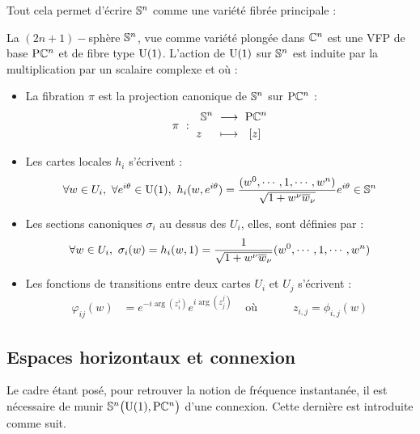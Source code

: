 Tout cela permet d'écrire $\S{n}$ comme une variété fibrée principale :
\begin{proposition}
	La $(2n+1)-$sphère $\S{n}$, vue comme variété plongée dans $\C^n$ est une VFP de base $\PC{n}$ et de fibre type $\U{1}$. L'action de $\U{1}$ sur $\S{n}$ est induite par la multiplication par un scalaire complexe et où :
	\begin{itemize}
		\item La fibration $\pi$ est la projection canonique de $\S{n}$ sur $\PC{n}$ :
		\begin{equation}
			\pi\ :\ \begin{aligned} \S{n}\ &\lr\ \PC{n} \\ z\quad\ &\lmt\ \ [z]\end{aligned}
		\end{equation}
		
		\item Les cartes locales $h_i$ s'écrivent :
		\begin{equation}
			\forall w \in U_i,\ \forall e^{i\theta}\in\U{1},\  h_i(w,e^{i\theta}) = \frac{(w^0,\cdots, 1,\cdots, w^n)}{\sqrt{1 + w^\nu \congu{w}_\nu}}e^{i\theta} \in \S{n}
		\end{equation}
		
		\item Les sections canoniques $\sigma_i$ au dessus des $U_i$, elles,  sont définies par :
		\begin{equation}
			\forall w \in U_i,\ \sigma_i(w) = h_i(w, 1) = \frac{1}{\sqrt{1 + w^\nu \congu{w}_\nu}}(w^0,\cdots, 1,\cdots, w^n)
		\end{equation}
		
		\item Les fonctions de transitions entre deux cartes $U_i$ et $U_j$ s'écrivent :
		\begin{align}
			\varphi_{ij}(w) &= e^{-i \arg (z_i^i)} e^{i \arg (z_j^j)}  &  \text{ où }&\qquad z_{i,j} = \phi_{i,j}(w)
		\end{align}
	\end{itemize}
\end{proposition}
\skipl




\subsection{Espaces horizontaux et connexion}\label{subsec:connexion2VFP}

Le cadre étant posé, pour retrouver la notion de fréquence instantanée, il est nécessaire de munir $\VFP$ d'une connexion. Cette dernière est introduite comme suit.

